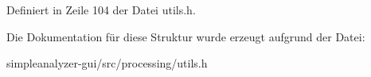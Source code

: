 Definiert in Zeile 104 der Datei utils.\-h.



Die Dokumentation für diese Struktur wurde erzeugt aufgrund der Datei\-:\begin{DoxyCompactItemize}
\item 
simpleanalyzer-\/gui/src/processing/utils.\-h\end{DoxyCompactItemize}
